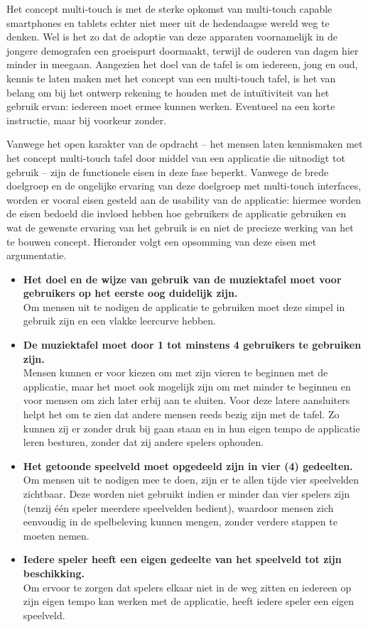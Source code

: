 \documentclass{acm}
\begin{document}
Het concept multi-touch is met de sterke opkomst van multi-touch capable smartphones en tablets echter niet meer uit de hedendaagse wereld weg te denken. Wel is het zo dat de adoptie van deze apparaten voornamelijk in de jongere demografen een groeispurt doormaakt, terwijl de ouderen van dagen hier minder in meegaan. Aangezien het doel van de tafel is om iedereen, jong en oud, kennis te laten maken met het concept van een multi-touch tafel, is het van belang om bij het ontwerp rekening te houden met de intu\"itiviteit van het gebruik ervan: iedereen moet ermee kunnen werken. Eventueel na een korte instructie, maar bij voorkeur zonder.

Vanwege het open karakter van de opdracht -- het mensen laten kennismaken met het concept multi-touch tafel door middel van een applicatie die uitnodigt tot gebruik -- zijn de functionele eisen in deze fase beperkt. Vanwege de brede doelgroep en de ongelijke ervaring van deze doelgroep met multi-touch interfaces, worden er vooral eisen gesteld aan de usability van de applicatie: hiermee worden de eisen bedoeld die invloed hebben hoe gebruikers de applicatie gebruiken en wat de gewenste ervaring van het gebruik is en niet de precieze werking van het te bouwen concept. Hieronder volgt een opsomming van deze eisen met argumentatie.

\begin{itemize}
	\item \textbf{Het doel en de wijze van gebruik van de muziektafel moet voor gebruikers op het eerste oog duidelijk zijn.} \\ Om mensen uit te nodigen de applicatie te gebruiken moet deze simpel in gebruik zijn en een vlakke leercurve hebben.
	\item \textbf{De muziektafel moet door 1 tot minstens 4 gebruikers te gebruiken zijn.} \\ Mensen kunnen er voor kiezen om met zijn vieren te beginnen met de applicatie, maar het moet ook mogelijk zijn om met minder te beginnen en voor mensen om zich later erbij aan te sluiten. Voor deze latere aansluiters helpt het om te zien dat andere mensen reeds bezig zijn met de tafel. Zo kunnen zij er zonder druk bij gaan staan en in hun eigen tempo de applicatie leren besturen, zonder dat zij andere spelers ophouden.
	\item \textbf{Het getoonde speelveld moet opgedeeld zijn in vier (4) gedeelten.} \\ Om mensen uit te nodigen mee te doen, zijn er te allen tijde vier speelvelden zichtbaar. Deze worden niet gebruikt indien er minder dan vier spelers zijn (tenzij \'e\'en speler meerdere speelvelden bedient), waardoor mensen zich eenvoudig in de spelbeleving kunnen mengen, zonder verdere stappen te moeten nemen.
	\item \textbf{Iedere speler heeft een eigen gedeelte van het speelveld tot zijn beschikking.} \\ Om ervoor te zorgen dat spelers elkaar niet in de weg zitten en iedereen op zijn eigen tempo kan werken met de applicatie, heeft iedere speler een eigen speelveld.
\end{itemize}
\end{document}
